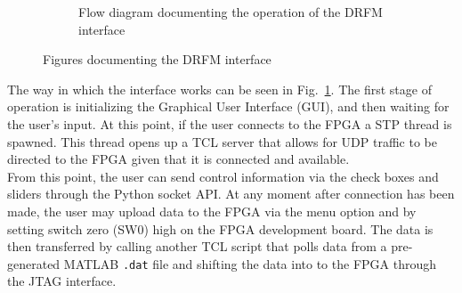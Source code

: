 \begin{figure}[h!]
\begin{subfigure}{0.5\linewidth}
				\caption{Flow diagram documenting the operation of the DRFM interface}
				\label{fig:UI_flowchart}
			\end{subfigure}
			\caption{Figures documenting the DRFM interface}
			\label{fig:test}
		\end{figure}
		\noindent The way in which the interface works can be seen in Fig.~\ref{fig:UI_flowchart}. The first stage of operation is initializing the Graphical User Interface (GUI), and then waiting for the user's input. At this point, if the user connects to the FPGA a STP thread is spawned. This thread opens up a TCL server that allows for UDP traffic to be directed to the FPGA given that it is connected and available. \\ \newline From this point, the user can send control information via the check boxes and sliders through the Python socket API. At any moment after connection has been made, the user may upload data to the FPGA via the menu option and by setting switch zero (SW0) high on the FPGA development board. The data is then transferred by calling another TCL script that polls data from a pre-generated MATLAB \texttt{.dat} file and shifting the data into to the FPGA through the JTAG interface.\\
